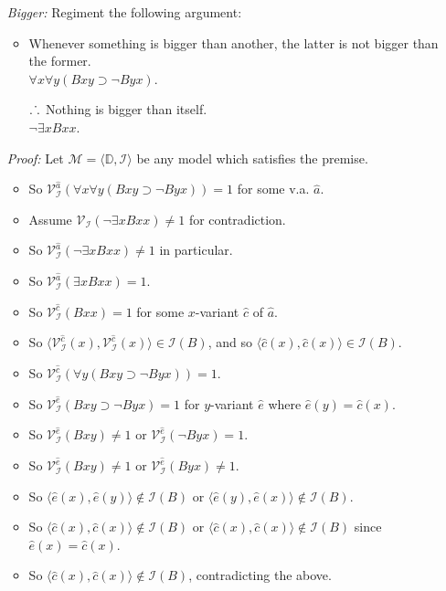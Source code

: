 \documentclass[a4paper, 11pt]{article} %
\newcommand{\tuple}[1]{\langle#1\rangle} %
\def\therefore{\ensuremath{\ldotp\dot\,\ldotp}}
\newcommand{\I}{\mathcal{I}}
\newcommand{\M}{\mathcal{M}}
\newcommand{\D}{\mathbb{D}}
\newcommand{\VV}[2]{\mathcal{V}_{#1}^{#2}} %
\begin{document}
\begin{enumerate}
  \item[\it Bigger:] Regiment the following argument:
    \begin{itemize}
      \item Whenever something is bigger than another, the latter is not bigger than the former.\\
        $\forall x\forall y(Bxy \supset \neg Byx)$.
      \item[\therefore] Nothing is bigger than itself.\\
        $\neg\exists x Bxx$.
    \end{itemize}
  \item[\it Proof:] Let $\M=\tuple{\D,\I}$ be any model which satisfies the premise. 
    \begin{itemize}
      \item So $\VV{\I}{\hat{a}}(\forall x\forall y(Bxy \supset \neg Byx))=1$ for some v.a. $\hat{a}$.
      \item Assume $\VV{\I}{}(\neg\exists x Bxx)\neq 1$ for contradiction. 
      \item So $\VV{\I}{\hat{a}}(\neg\exists x Bxx)\neq 1$ in particular.
      \item So $\VV{\I}{\hat{a}}(\exists x Bxx)=1$.
      \item So $\VV{\I}{\hat{c}}(Bxx)=1$ for some $x$-variant $\hat{c}$ of $\hat{a}$.
      \item So $\tuple{\VV{\I}{\hat{c}}(x),\VV{\I}{\hat{c}}(x)}\in\I(B)$, and so $\tuple{\hat{c}(x),\hat{c}(x)}\in\I(B)$.
      \item So $\VV{\I}{\hat{c}}(\forall y(Bxy \supset \neg Byx))=1$.
      \item So $\VV{\I}{\hat{e}}(Bxy \supset \neg Byx)=1$ for $y$-variant $\hat{e}$ where $\hat{e}(y)=\hat{c}(x)$.
      \item So $\VV{\I}{\hat{e}}(Bxy)\neq 1$ or $\VV{\I}{\hat{e}}(\neg Byx)=1$.
      \item So $\VV{\I}{\hat{e}}(Bxy)\neq 1$ or $\VV{\I}{\hat{e}}(Byx)\neq 1$.
      \item So $\tuple{\hat{e}(x),\hat{e}(y)}\notin\I(B)$ or $\tuple{\hat{e}(y),\hat{e}(x)}\notin\I(B)$.
      \item So $\tuple{\hat{c}(x),\hat{c}(x)}\notin\I(B)$ or $\tuple{\hat{c}(x),\hat{c}(x)}\notin\I(B)$ since $\hat{e}(x)=\hat{c}(x)$.
      \item So $\tuple{\hat{c}(x),\hat{c}(x)}\notin\I(B)$, contradicting the above.
    \end{itemize}

\end{enumerate}
\end{document}
